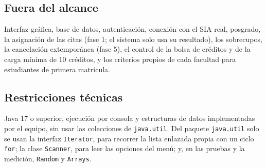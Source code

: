 \documentclass[conference]{IEEEtran}
\begin{document}
\subsection{Fuera del alcance}
Interfaz gráfica, base de datos, autenticación, conexión con el SIA real, posgrado, la asignación de las citas (fase 1; el sistema solo usa su resultado), los sobrecupos, la cancelación extemporánea (fase 5), el control de la bolsa de créditos y de la carga mínima de 10 créditos, y los criterios propios de cada facultad para estudiantes de primera matrícula.

\subsection{Restricciones técnicas}
Java 17 o superior, ejecución por consola y estructuras de datos implementadas por el equipo, sin usar las colecciones de \texttt{java.util}. Del paquete \texttt{java.util} solo se usan la interfaz \texttt{Iterator}, para recorrer la lista enlazada propia con un ciclo \texttt{for}; la clase \texttt{Scanner}, para leer las opciones del menú; y, en las pruebas y la medición, \texttt{Random} y \texttt{Arrays}.
\end{document}
